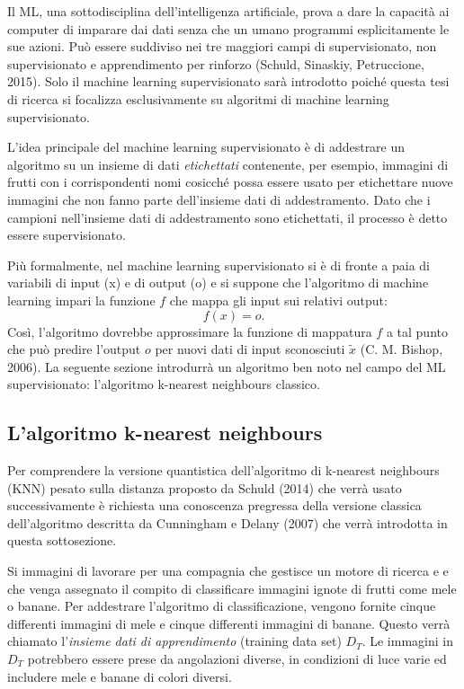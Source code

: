 Il \acf{ML}, una sottodisciplina dell'intelligenza artificiale, prova a dare la 
capacità ai computer di imparare dai dati senza che un umano programmi 
esplicitamente le sue azioni. Può essere suddiviso nei tre maggiori campi di 
supervisionato, non supervisionato e apprendimento per rinforzo (Schuld, 
Sinaskiy, Petruccione, 2015). Solo il machine learning supervisionato sarà 
introdotto poiché questa tesi di ricerca si focalizza esclusivamente su 
algoritmi di machine learning supervisionato. 

L'idea principale del machine learning supervisionato è di addestrare un 
algoritmo su un insieme di dati \emph{etichettati} contenente, per esempio, 
immagini di frutti con i corrispondenti nomi cosicché possa essere usato per 
etichettare nuove immagini che non fanno parte dell'insieme dati di addestramento. 
Dato che i campioni nell'insieme dati di addestramento sono etichettati, 
il processo è detto essere supervisionato. 

Più formalmente, nel machine learning supervisionato si è di fronte a paia di 
variabili di input (x) e di output (o) e si suppone che l'algoritmo di machine 
learning impari la funzione $f$ che mappa gli input sui relativi output: 
\begin{equation} \label{eq:2.38}
    f(x) = o.
\end{equation}
Così, l'algoritmo dovrebbe approssimare la funzione di mappatura $f$ a tal punto 
che può predire l'output $o$ per nuovi dati di input sconosciuti $\tilde{x}$ 
(C. M. Bishop, 2006). La seguente sezione introdurrà un algoritmo ben noto nel 
campo del \ac{ML} supervisionato: l'algoritmo k-nearest neighbours classico. 

\subsection{L'algoritmo k-nearest neighbours}

Per comprendere la versione quantistica dell'algoritmo di k-nearest neighbours 
(KNN) pesato sulla distanza proposto da Schuld (2014) che verrà usato 
successivamente è richiesta una conoscenza pregressa della versione classica 
dell'algoritmo descritta da Cunningham e Delany (2007) che verrà 
introdotta in questa sottosezione. 

Si immagini di lavorare per una compagnia che gestisce un motore di ricerca e 
e che venga assegnato il compito di classificare immagini ignote di frutti come 
mele o banane. Per addestrare l'algoritmo di classificazione, vengono fornite 
cinque differenti immagini di mele e cinque differenti immagini di banane. 
Questo verrà chiamato l'\emph{insieme dati di apprendimento} (training data set) 
$D_T$. Le immagini in $D_T$ potrebbero essere prese da angolazioni diverse, in 
condizioni di luce varie ed includere mele e banane di colori diversi. 

